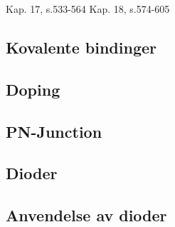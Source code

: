 Kap. 17, s.533-564
Kap. 18, s.574-605

\subsection{Kovalente bindinger}


\subsection{Doping}


\subsection{PN-Junction}


\subsection{Dioder}


\subsection{Anvendelse av dioder}

